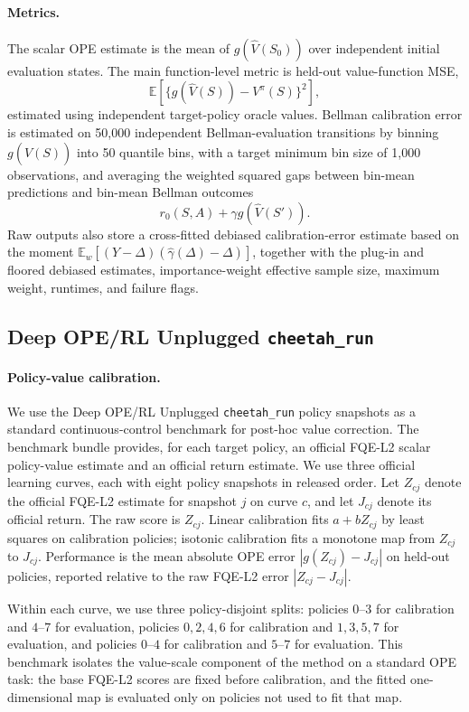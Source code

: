 \paragraph{Metrics.}
The scalar OPE estimate is the mean of \(g(\widehat V(S_0))\) over independent
initial evaluation states. The main function-level metric is held-out
value-function MSE,
\[
  \mathbb{E}\!\left[\{g(\widehat V(S))-V^\pi(S)\}^2\right],
\]
estimated using independent target-policy oracle values. Bellman calibration
error is estimated on 50,000 independent Bellman-evaluation transitions by binning
\(g(\widehat V(S))\) into 50 quantile bins, with a target minimum bin size of
1,000 observations, and averaging the weighted squared gaps between bin-mean
predictions and bin-mean Bellman outcomes
\[
  r_0(S,A)+\gamma g(\widehat V(S')) .
\]
Raw outputs also store a cross-fitted debiased calibration-error estimate based
on the moment
\(\mathbb{E}_w[(Y-\Delta)(\widehat\gamma(\Delta)-\Delta)]\), together with the
plug-in and floored debiased estimates, importance-weight effective sample
size, maximum weight, runtimes, and failure flags.

\subsection{Deep OPE/RL Unplugged \texttt{cheetah\_run}}
\label{app:cheetah-benchmark}

\paragraph{Policy-value calibration.}
We use the Deep OPE/RL Unplugged \texttt{cheetah\_run} policy snapshots as a
standard continuous-control benchmark for post-hoc value correction. The
benchmark bundle provides, for each target policy, an official FQE-L2 scalar
policy-value estimate and an official return estimate. We use three official
learning curves, each with eight policy snapshots in released order. Let
\(Z_{cj}\) denote the official FQE-L2 estimate for snapshot \(j\) on curve
\(c\), and let \(J_{cj}\) denote its official return. The raw score is
\(Z_{cj}\). Linear calibration fits \(a+bZ_{cj}\) by least squares on
calibration policies; isotonic calibration fits a monotone map from \(Z_{cj}\)
to \(J_{cj}\). Performance is the mean absolute OPE error
\(|g(Z_{cj})-J_{cj}|\) on held-out policies, reported relative to the raw
FQE-L2 error \(|Z_{cj}-J_{cj}|\).

Within each curve, we use three policy-disjoint splits: policies \(0\)--\(3\)
for calibration and \(4\)--\(7\) for evaluation, policies \(0,2,4,6\) for
calibration and \(1,3,5,7\) for evaluation, and policies \(0\)--\(4\) for
calibration and \(5\)--\(7\) for evaluation. This benchmark isolates the
value-scale component of the method on a standard OPE task: the base FQE-L2
scores are fixed before calibration, and the fitted one-dimensional map is
evaluated only on policies not used to fit that map.

